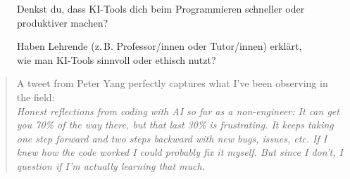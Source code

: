\documentclass[paper=a4,fontsize=12pt,ngerman]{scrartcl}
\begin{document}
\begin{figure}[ht]
    \centering
    \begin{minipage}[t]{0.45\textwidth}
        \centering
        \caption{Denkst du, dass KI-Tools dich beim Programmieren schneller oder produktiver machen?}
    \end{minipage}
    \hfill
    \begin{minipage}[t]{0.45\textwidth}
        \centering
        \caption{Haben Lehrende (z.\,B. Professor/innen oder Tutor/innen) erklärt, wie man KI-Tools sinnvoll oder ethisch nutzt?}
    \end{minipage}
\end{figure}
\clearpage

\begin{quote}
A tweet from Peter Yang perfectly captures what I’ve been observing in the field: \\
\textit{Honest reflections from coding with AI so far as a non-engineer: It can get you 70\% of the way there, but that last 30\% is frustrating. It keeps taking one step forward and two steps backward with new bugs, issues, etc. If I knew how the code worked I could probably fix it myself. But since I don’t, I question if I’m actually learning that much.}
\citep{VibeCodingTheFutureOfProgramming}
\end{quote}
\end{document}
